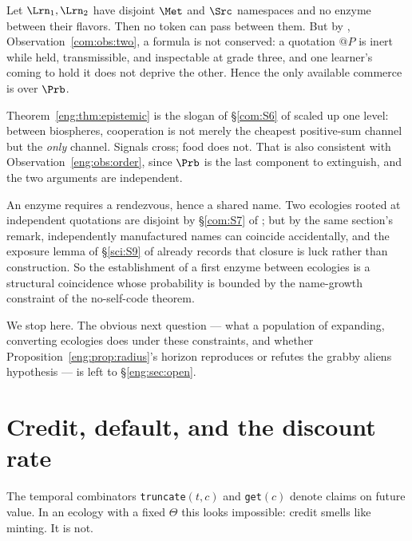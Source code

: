 \begin{theorem}
\label{eng:thm:epistemic}
Let $\Lrn_1, \Lrn_2$ have disjoint $\Met$ and $\Src$ namespaces and no
enzyme between their flavors. Then no token can pass between them. But by
\chComp, Observation~\ref{com:obs:two}, a formula is not conserved: a quotation $@P$
is inert while held, transmissible, and inspectable at grade three, and one
learner's coming to hold it does not deprive the other. Hence the only
available commerce is over $\Prb$.
\end{theorem}

Theorem~\ref{eng:thm:epistemic} is the slogan of \S\ref{com:S6} of \chComp scaled up
one level: between biospheres, cooperation is not merely the cheapest
positive-sum channel but the \emph{only} channel. Signals cross; food does
not. That is also consistent with Observation~\ref{eng:obs:order}, since $\Prb$
is the last component to extinguish, and the two arguments are
independent.

\begin{proposition}\label{eng:first-contact-coincidence-construction}
An enzyme requires a rendezvous, hence a shared name. Two ecologies rooted
at independent quotations are disjoint by
\S\ref{com:S7} of \chComp; but by the same section's remark, independently
manufactured names can coincide accidentally, and the exposure lemma of
\S\ref{sci:S9} of \chSci already records that closure is luck rather than
construction. So the establishment of a first enzyme between ecologies is a
structural coincidence whose probability is bounded by the name-growth
constraint of the no-self-code theorem.
\end{proposition}

We stop here. The obvious next question --- what a population of expanding,
converting ecologies does under these constraints, and whether
Proposition~\ref{eng:prop:radius}'s horizon reproduces or refutes the grabby
aliens hypothesis \cite{hanson} --- is left to \S\ref{eng:sec:open}.

\section{Credit, default, and the discount rate}\label{eng:S11}
\label{eng:sec:credit}

The temporal combinators \texttt{truncate}$(t,c)$ and \texttt{get}$(c)$
denote claims on future value. In an ecology with a fixed $\Theta$ this
looks impossible: credit smells like minting. It is not.

